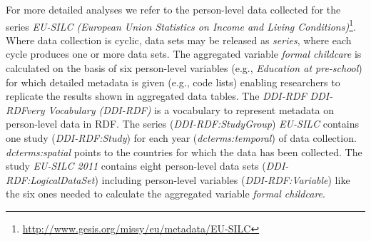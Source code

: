 \documentclass[conference]{IEEEtran}
\newcommand{\ke}[1]{\todo[size=\small, color=red!40]{\textbf{Kai:} #1}}
\newcommand{\tb}[1]{\todo[size=\small, color=green!40]{\textbf{Thomas:} #1}}
\begin{document}
For more detailed analyses we refer to the person-level data collected for the series \emph{EU-SILC (European Union Statistics on Income and Living Conditions)}\footnote{\url{http://www.gesis.org/missy/eu/metadata/EU-SILC}}. 
Where data collection is cyclic, data sets may be released as \emph{series}, 
where each cycle produces one or more data sets. 
The aggregated variable \emph{formal childcare} is calculated on the basis of six person-level variables 
(e.g., \emph{Education at pre-school})
for which detailed metadata is given 
(e.g., code lists)
enabling researchers to replicate the results shown in aggregated data tables.
The \emph{DDI-RDF DDI-RDFvery Vocabulary (DDI-RDF)} is a vocabulary to represent metadata on person-level data in RDF.
The series (\emph{DDI-RDF:StudyGroup}) \emph{EU-SILC} contains one study (\emph{DDI-RDF:Study}) for each year (\emph{dcterms:temporal}) of data collection.   
\emph{dcterms:spatial} points to the countries for which the data has been collected.
The study \emph{EU-SILC 2011} contains eight person-level data sets (\emph{DDI-RDF:LogicalDataSet})
including person-level variables (\emph{DDI-RDF:Variable}) like the six ones needed to calculate the aggregated variable \emph{formal childcare}.
\end{document}
